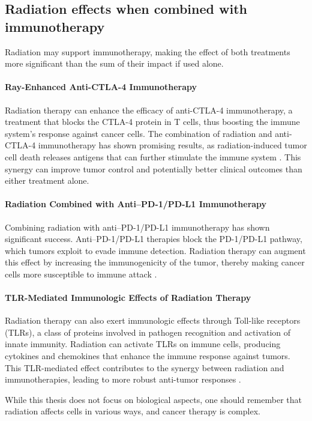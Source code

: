 \subsection{Radiation effects when combined with immunotherapy}
Radiation may support immunotherapy, making the effect of both treatments more significant than the sum of their impact if used alone.

\paragraph{Ray-Enhanced Anti-CTLA-4 Immunotherapy}
Radiation therapy can enhance the efficacy of anti-CTLA-4 immunotherapy, a treatment that blocks the CTLA-4 protein in T cells, thus boosting the immune system's response against cancer cells.
The combination of radiation and anti-CTLA-4 immunotherapy has shown promising results, as radiation-induced tumor cell death releases antigens that can further stimulate the immune system \cite{Vanpouillebox2015}.
This synergy can improve tumor control and potentially better clinical outcomes than either treatment alone.

\paragraph{Radiation Combined with Anti–PD-1/PD-L1 Immunotherapy}
Combining radiation with anti–PD-1/PD-L1 immunotherapy has shown significant success.
Anti–PD-1/PD-L1 therapies block the PD-1/PD-L1 pathway, which tumors exploit to evade immune detection.
Radiation therapy can augment this effect by increasing the immunogenicity of the tumor, thereby making cancer cells more susceptible to immune attack \cite{He2021}.

\paragraph{TLR-Mediated Immunologic Effects of Radiation Therapy}
Radiation therapy can also exert immunologic effects through Toll-like receptors (TLRs), a class of proteins involved in pathogen recognition and activation of innate immunity.
Radiation can activate TLRs on immune cells, producing cytokines and chemokines that enhance the immune response against tumors.
This TLR-mediated effect contributes to the synergy between radiation and immunotherapies, leading to more robust anti-tumor responses \cite{Walshan2020}.

While this thesis does not focus on biological aspects, one should remember that radiation affects cells in various ways, and cancer therapy is complex.



